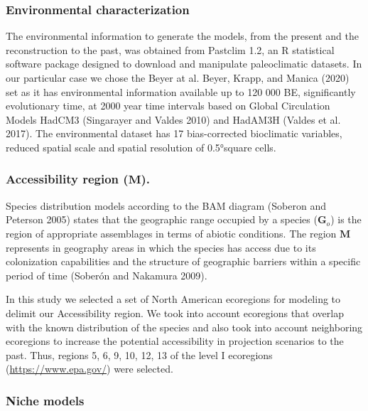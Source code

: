 \documentclass[
]{article}
\begin{document}
\hypertarget{environmental-characterization}{%
\subsubsection{Environmental
characterization}\label{environmental-characterization}}

The environmental information to generate the models, from the present
and the reconstruction to the past, was obtained from Pastclim 1.2, an R
statistical software package designed to download and manipulate
paleoclimatic datasets. In our particular case we chose the Beyer at al.
Beyer, Krapp, and Manica (2020) set as it has environmental information
available up to 120 000 BE, significantly evolutionary time, at 2000
year time intervals based on Global Circulation Models HadCM3
(Singarayer and Valdes 2010) and HadAM3H (Valdes et al. 2017). The
environmental dataset has 17 bias-corrected bioclimatic variables,
reduced spatial scale and spatial resolution of 0.5°square cells.

\hypertarget{accessibility-region-textbfm.}{%
\subsubsection{\texorpdfstring{Accessibility region
(\(\textbf{M}\)).}{Accessibility region (\textbackslash textbf\{M\}).}}\label{accessibility-region-textbfm.}}

Species distribution models according to the BAM diagram (Soberon and
Peterson 2005) states that the geographic range occupied by a species
(\(\textbf{G}_o\)) is the region of appropriate assemblages in terms of
abiotic conditions. The region \(\textbf{M}\) represents in geography
areas in which the species has access due to its colonization
capabilities and the structure of geographic barriers within a specific
period of time (Soberón and Nakamura 2009).

In this study we selected a set of North American ecoregions for
modeling to delimit our Accessibility region. We took into account
ecoregions that overlap with the known distribution of the species and
also took into account neighboring ecoregions to increase the potential
accessibility in projection scenarios to the past. Thus, regions 5, 6,
9, 10, 12, 13 of the level I ecoregions (\url{https://www.epa.gov/})
were selected.

\hypertarget{niche-models}{%
\subsubsection{Niche models}\label{niche-models}}
\end{document}
